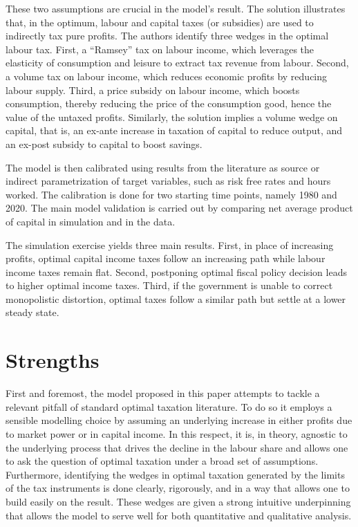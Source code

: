 \documentclass[american]{scrartcl}
\begin{document}
These two assumptions are crucial in the model's result. The solution illustrates that, in the optimum, labour and capital taxes (or subsidies) are used to indirectly tax pure profits. The authors identify three wedges in the optimal labour tax. First, a ``Ramsey'' tax on labour income, which leverages the elasticity of consumption and leisure to extract tax revenue from labour. Second, a volume tax on labour income, which reduces economic profits by reducing labour supply. Third, a price subsidy on labour income, which boosts consumption, thereby reducing the price of the consumption good, hence the value of the untaxed profits. Similarly, the solution implies a volume wedge on capital, that is, an ex-ante increase in taxation of capital to reduce output, and an ex-post subsidy to capital to boost savings.

The model is then calibrated using results from the literature as source or indirect parametrization of target variables, such as risk free rates and hours worked. The calibration is done for two starting time points, namely 1980 and 2020. The main model validation is carried out by comparing net average product of capital in simulation and in the data.

The simulation exercise yields three main results. First, in place of increasing profits, optimal capital income taxes follow an increasing path while labour income taxes remain flat. Second, postponing optimal fiscal policy decision leads to higher optimal income taxes. Third, if the government is unable to correct monopolistic distortion, optimal taxes follow a similar path but settle at a lower steady state.

\section{Strengths}

First and foremost, the model proposed in this paper attempts to tackle a relevant pitfall of standard optimal taxation literature. To do so it employs a sensible modelling choice by assuming an underlying increase in either profits due to market power or in capital income. In this respect, it is, in theory, agnostic to the underlying process that drives the decline in the labour share and allows one to ask the question of optimal taxation under a broad set of assumptions. Furthermore, identifying the wedges in optimal taxation generated by the limits of the tax instruments is done clearly, rigorously, and in a way that allows one to build easily on the result. These wedges are given a strong intuitive underpinning that allows the model to serve well for both quantitative and qualitative analysis.
\end{document}
